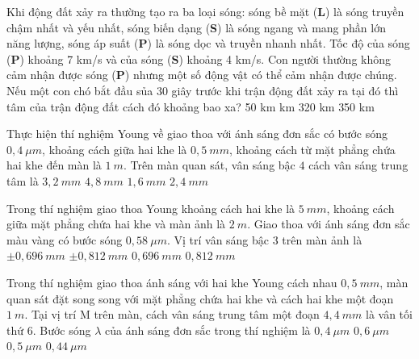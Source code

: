 \begin{ex}
	Khi động đất xảy ra thường tạo ra ba loại sóng: sóng bề mặt (\textbf{L}) là sóng truyền chậm nhất và yếu nhất, sóng biến dạng (\textbf{S}) là sóng ngang và mang phần lớn năng lượng, sóng áp suất (\textbf{P}) là sóng dọc và truyền nhanh nhất. Tốc độ của sóng (\textbf{P}) khoảng 7 km/s và của sóng (\textbf{S}) khoảng 4 km/s. Con người thường không cảm nhận được sóng (\textbf{P}) nhưng một số động vật có thể cảm nhận được chúng. Nếu một con chó bắt đầu sủa 30 giây trước khi trận động đất xảy ra tại đó thì tâm của trận động đất cách đó khoảng bao xa?
	\choice
	{50 km}
	{ km}
	{320 km}
	{350 km}
	
	
\end{ex}
	\begin{ex}%
		Thực hiện thí nghiệm Young về giao thoa với ánh sáng đơn sắc có bước sóng $0,4\ \mu m $, khoảng cách giữa hai khe là $0,5\ mm$, khoảng cách từ mặt phẳng chứa hai khe đến màn là $1\ m$. Trên màn quan sát, vân sáng bậc $4$ cách vân sáng trung tâm là
		\choice
		{\True $3,2\ mm$}
		{$4,8\ mm$}
		{$1,6\ mm$}
		{$2,4\ mm$}
	\end{ex}
	\begin{ex}%
		Trong thí nghiệm giao thoa Young khoảng cách hai khe là $5\ mm$, khoảng cách giữa mặt phẳng chứa hai khe và màn ảnh là $2\ m$. Giao thoa với ánh sáng đơn sắc màu vàng có bước sóng $0,58\ \mu m$. Vị trí vân sáng bậc $3$ trên màn ảnh là
		\choice
		{\True $ \pm 0,696\ mm$}
		{$ \pm  0,812\ mm$}
		{$0,696\ mm$}
		{$0,812\ mm$}
	\end{ex}
	\begin{ex}%
		Trong thí nghiệm giao thoa ánh sáng với hai khe Young cách nhau $0,5\ mm$, màn quan sát đặt song song với mặt phẳng chứa hai khe và cách hai khe một đoạn $1\ m$. Tại vị trí M trên màn, cách vân sáng trung tâm một đoạn $4,4\ mm$ là vân tối thứ $6$. Bước sóng $\lambda $ của ánh sáng đơn sắc trong thí nghiệm là
		\choice
		{\True $0,4\ \mu m $}
		{$0,6\ \mu m $}
		{$0,5\ \mu m $}
		{$0,44\ \mu m $}
	\end{ex}

